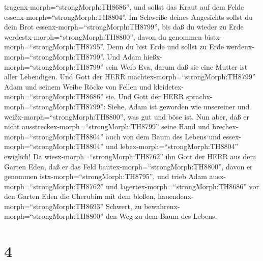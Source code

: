 tragenx-morph=``strongMorph:TH8686'', und sollst das Kraut auf dem Felde
essenx-morph=``strongMorph:TH8804''.  Im Schweiße deines
Angesichts sollst du dein Brot essenx-morph=``strongMorph:TH8799'', bis
daß du wieder zu Erde werdestx-morph=``strongMorph:TH8800'', davon du
genommen bistx-morph=``strongMorph:TH8795''. Denn du bist Erde und
sollst zu Erde werdenx-morph=``strongMorph:TH8799''.  Und
Adam hießx-morph=``strongMorph:TH8799'' sein Weib Eva, darum daß sie
eine Mutter ist aller Lebendigen.  Und Gott der HERR
machtex-morph=``strongMorph:TH8799'' Adam und seinem Weibe Röcke von
Fellen und kleidetex-morph=``strongMorph:TH8686'' sie.  Und
Gott der HERR sprachx-morph=``strongMorph:TH8799'': Siehe, Adam ist
geworden wie unsereiner und weißx-morph=``strongMorph:TH8800'', was gut
und böse ist. Nun aber, daß er nicht
ausstreckex-morph=``strongMorph:TH8799'' seine Hand und
brechex-morph=``strongMorph:TH8804'' auch von dem Baum des Lebens und
essex-morph=``strongMorph:TH8804'' und
lebex-morph=``strongMorph:TH8804'' ewiglich!  Da
wiesx-morph=``strongMorph:TH8762'' ihn Gott der HERR aus dem Garten
Eden, daß er das Feld bautex-morph=``strongMorph:TH8800'', davon er
genommen istx-morph=``strongMorph:TH8795'',  und trieb Adam
ausx-morph=``strongMorph:TH8762'' und
lagertex-morph=``strongMorph:TH8686'' vor den Garten Eden die Cherubim
mit dem bloßen, hauendenx-morph=``strongMorph:TH8693'' Schwert, zu
bewahrenx-morph=``strongMorph:TH8800'' den Weg zu dem Baum des Lebens.

\hypertarget{section-3}{%
\section{4}\label{section-3}}

